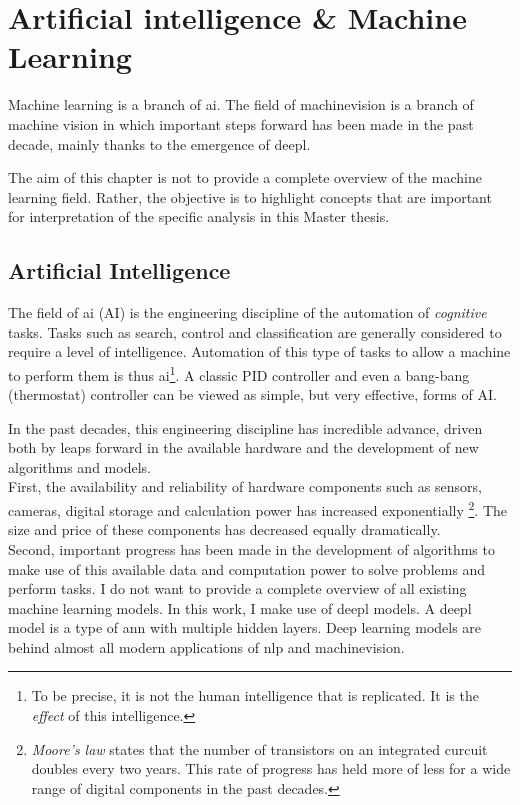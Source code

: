 \chapter{Artificial intelligence \& Machine Learning}

Machine learning is a branch of \Gls{ai}. 
The field of \Gls{machinevision} is a branch of machine vision in which important steps forward has been made in the past decade, mainly thanks to the emergence of \Gls{deepl}.

The aim of this chapter is not to provide a complete overview of the machine learning field.
Rather, the objective is to highlight concepts that are important for interpretation of the specific analysis in this Master thesis.

\section{Artificial Intelligence}

The field of \Gls{ai} (AI) is the engineering discipline of the automation of \textit{cognitive} tasks.
Tasks such as search, control and classification are generally considered to require a level of intelligence. 
Automation of this type of tasks to allow a machine to perform them is thus \Gls{ai}\footnote{To be precise, it is not the human intelligence that is replicated. It is the \textit{effect} of this intelligence.}.
A classic PID controller and even a bang-bang (thermostat) controller can be viewed as simple, but very effective, forms of AI.


In the past decades, this engineering discipline has incredible advance, driven both by leaps forward in the available hardware and the development of new algorithms and models. \\
First, the availability and reliability of hardware components such as sensors, cameras, digital storage and calculation power has increased exponentially 
\footnote{ \textit{Moore's law} states that the number of transistors on an integrated curcuit doubles every two years. This rate of progress has held more of less for a wide range of digital components in the past decades.}.
The size and price of these components has decreased equally dramatically. \\
Second, important progress has been made in the development of algorithms to make use of this available data and computation power to solve problems and perform tasks.
I do not want to provide a complete overview of all existing machine learning models. 
In this work, I make use of \Gls{deepl} models.
A \Gls{deepl} model is a type of \acrfull{ann} with multiple hidden layers. 
Deep learning models are behind almost all modern applications of \acrfull{nlp} and \Gls{machinevision}.

